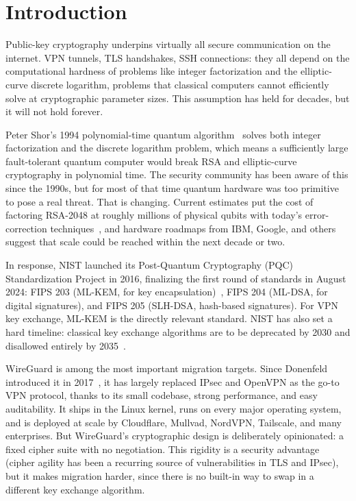 \chapter{Introduction}
\label{chap:introduction}

Public-key cryptography underpins virtually all secure communication on the internet. VPN tunnels, TLS handshakes, SSH connections: they all depend on the computational hardness of problems like integer factorization and the elliptic-curve discrete logarithm, problems that classical computers cannot efficiently solve at cryptographic parameter sizes. This assumption has held for decades, but it will not hold forever.

Peter Shor's 1994 polynomial-time quantum algorithm~\cite{shor1994algorithms} solves both integer factorization and the discrete logarithm problem, which means a sufficiently large fault-tolerant quantum computer would break RSA and elliptic-curve cryptography in polynomial time. The security community has been aware of this since the 1990s, but for most of that time quantum hardware was too primitive to pose a real threat. That is changing. Current estimates put the cost of factoring RSA-2048 at roughly millions of physical qubits with today's error-correction techniques~\cite{gidney2021factor}, and hardware roadmaps from IBM, Google, and others suggest that scale could be reached within the next decade or two.

In response, NIST launched its Post-Quantum Cryptography (PQC) Standardization Project in 2016, finalizing the first round of standards in August 2024: FIPS 203 (ML-KEM, for key encapsulation)~\cite{fips203}, FIPS 204 (ML-DSA, for digital signatures), and FIPS 205 (SLH-DSA, hash-based signatures). For VPN key exchange, ML-KEM is the directly relevant standard. NIST has also set a hard timeline: classical key exchange algorithms are to be deprecated by 2030 and disallowed entirely by 2035~\cite{nistir8547}.

WireGuard is among the most important migration targets. Since Donenfeld introduced it in 2017~\cite{donenfeld2017wireguard}, it has largely replaced IPsec and OpenVPN as the go-to VPN protocol, thanks to its small codebase, strong performance, and easy auditability. It ships in the Linux kernel, runs on every major operating system, and is deployed at scale by Cloudflare, Mullvad, NordVPN, Tailscale, and many enterprises. But WireGuard's cryptographic design is deliberately opinionated: a fixed cipher suite with no negotiation. This rigidity is a security advantage (cipher agility has been a recurring source of vulnerabilities in TLS and IPsec), but it makes migration harder, since there is no built-in way to swap in a different key exchange algorithm.

